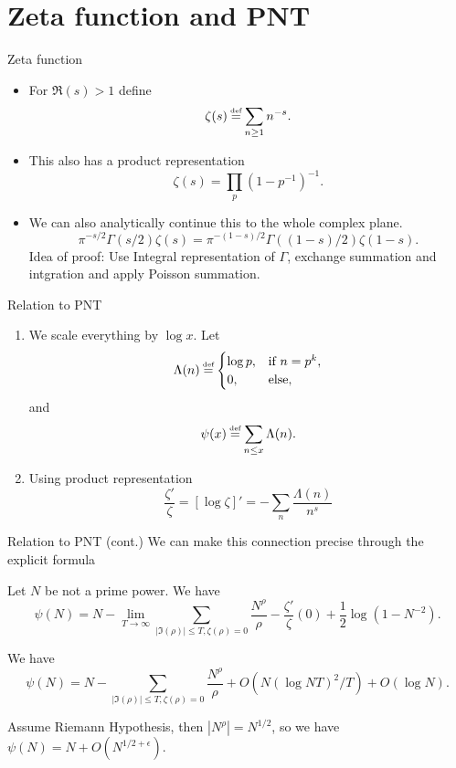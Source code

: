 \documentclass[aspectratio=169,xcolor=dvipsnames]{beamer}
\newcommand\defeq{\mathrel{\stackrel{\makebox[0pt]{\mbox{\normalfont\tiny def}}}{=}}}
\begin{document}
\section{Zeta function and PNT}
\begin{frame}{Zeta function}
    \begin{itemize}
        \item For $\Re (s)>1$ define \[
        \zeta (s) \defeq \sum_{n\geq 1}n^{-s}.
        \]
        \item This also has a product representation \[
        \zeta(s) =\prod_{p}(1-p^{-1})^{-1}.
        \]
        \item We can also analytically continue this to the whole complex plane. \[
        \pi^{-s/2}\Gamma(s/2)\zeta(s) = \pi^{-(1-s)/2}\Gamma((1-s)/2)\zeta(1-s).
        \]
        Idea of proof: Use Integral representation of $\Gamma$, exchange summation and intgration and apply Poisson summation. 
    \end{itemize}
\end{frame}
\begin{frame}{Relation to PNT}
    \begin{enumerate}
        \item We scale everything by $\log x$. Let \[
            \Lambda(n)\defeq\begin{cases}
                \log p, &\textrm{if }n=p^k,\\
                0, & \rm{else,}
            \end{cases}
        \] and \[
        \psi(x)\defeq \sum_{n\leq x} \Lambda (n).
        \]
        \item Using product representation \[
        \frac{\zeta'}{\zeta} = [\log \zeta]' = -\sum_{n} \frac{\Lambda(n)}{n^s}
        \]
    \end{enumerate}
\end{frame}
\begin{frame}{Relation to PNT (cont.)}
   We can make this connection precise through the explicit formula \begin{theorem} Let $N$ be not a prime power. We have
    \[
    \psi(N) = N-\lim_{T\to \infty} \sum_{|\Im(\rho)|\leq T, \zeta(\rho)=0} \frac{N^{\rho}}{\rho} - \frac{\zeta'}{\zeta}(0)+ \frac{1}{2}\log (1-N^{-2}).
    \]
   \end{theorem}
   \begin{theorem}  We have
    \[
    \psi(N) = N- \sum_{|\Im(\rho)|\leq T, \zeta(\rho)=0} \frac{N^{\rho}}{\rho} + O(N(\log NT)^2/T) + O(\log N).
    \]
   \end{theorem}
   Assume Riemann Hypothesis, then $|N^\rho|=N^{1/2}$, so we have $\psi(N)= N+ O(N^{1/2+\epsilon})$.
\end{frame}
\end{document}

